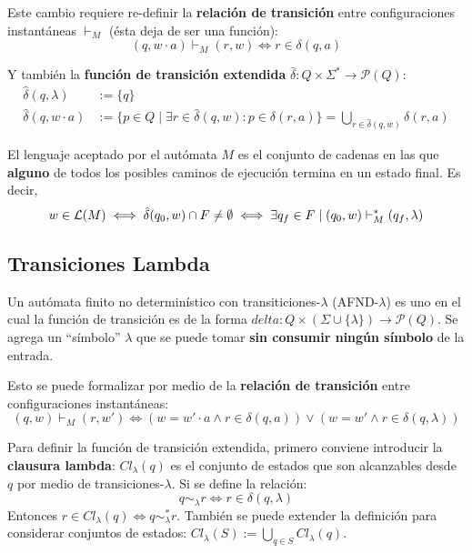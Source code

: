 
Este cambio requiere re-definir la \textbf{relación de transición} entre configuraciones instantáneas $\vdash_M$ (ésta deja de ser una función):
$$
(q, w \cdot a) \vdash_M (r, w) \iff r \in \delta(q, a)
$$

Y también la \textbf{función de transición extendida} $\hat \delta : Q \times \Sigma^* \to \mathcal P (Q)$:
$$
\begin{aligned}
    \hat \delta(q, \lambda) & := \{q\} \\
    \hat \delta(q, w \cdot a) & := \{p \in Q \mid \exists r \in \hat \delta (q, w) : p \in \delta (r, a)\} = \bigcup_{r \in \hat \delta(q, w)} \delta(r, a)
\end{aligned}
$$

El lenguaje aceptado por el autómata $M$ es el conjunto de cadenas en las que \textbf{alguno} de todos los posibles caminos de ejecución termina en un estado final. Es decir,
$$
w \in \mathcal{L}(M) \iff \hat \delta(q_0, w) \cap F \neq \emptyset \iff \exists q_f \in F \mid (q_0, w) \vdash_M^* (q_f, \lambda)
$$

\subsection{Transiciones Lambda}

Un autómata finito no determinístico con transiticiones-$\lambda$ (AFND-$\lambda$) es uno en el cual la función de transición es de la forma $delta : Q \times (\Sigma \cup \{\lambda\}) \to \mathcal P (Q)$. Se agrega un ``símbolo'' $\lambda$ que se puede tomar \textbf{sin consumir ningún símbolo} de la entrada.


Esto se puede formalizar por medio de la \textbf{relación de transición} entre configuraciones instantáneas:
$$
(q, w) \vdash_M (r, w') \iff (w = w' \cdot a \land r \in \delta(q, a)) \lor (w = w' \land r \in \delta(q, \lambda))
$$

Para definir la función de transición extendida, primero conviene introducir la \textbf{clausura lambda}: $Cl_\lambda(q)$ es el conjunto de estados que son alcanzables desde $q$ por medio de transiciones-$\lambda$. Si se define la relación:
$$q \sim_\lambda r \iff r \in \delta(q, \lambda)$$
Entonces $r \in Cl_\lambda(q) \iff q \sim_\lambda^* r$. También se puede extender la definición para considerar conjuntos de estados: $Cl_\lambda(S) := \bigcup_{q \in S} Cl_\lambda(q)$.

